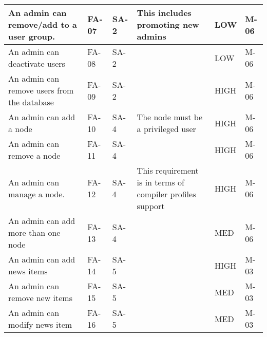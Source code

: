 \begin{longtable}{|p{4cm}|l|l|p{4cm}|l|l|}
An admin can remove/add to a user group. & FA-07 & SA-2 & This
includes promoting new admins & LOW & M-06 \\ 
\hline 

An admin can deactivate users & FA-08 & SA-2 & & LOW & M-06 \\ 
\hline

An admin can remove users from the database & FA-09 & SA-2 && HIGH & M-06 \\ 
\hline

An admin can add a node & FA-10 & SA-4 & The node must be a privileged
user & HIGH & M-06 \\ 
\hline 

An admin can remove a node & FA-11 & SA-4 & & HIGH & M-06 \\ 
\hline 

An admin can manage a node. & FA-12 & SA-4 & This requirement is in terms of
compiler profiles support & HIGH & M-06 \\ 
\hline 

An admin can add more than one node & FA-13 & SA-4 & & MED & M-06 \\ 
\hline 

An admin can add news items & FA-14 & SA-5 & & HIGH & M-03 \\ 
\hline

An admin can remove new items & FA-15 & SA-5 & & MED & M-03 \\ 
\hline 

An admin can modify news item & FA-16 & SA-5 & & MED & M-03 \\ 
\hline 
\end{longtable}

